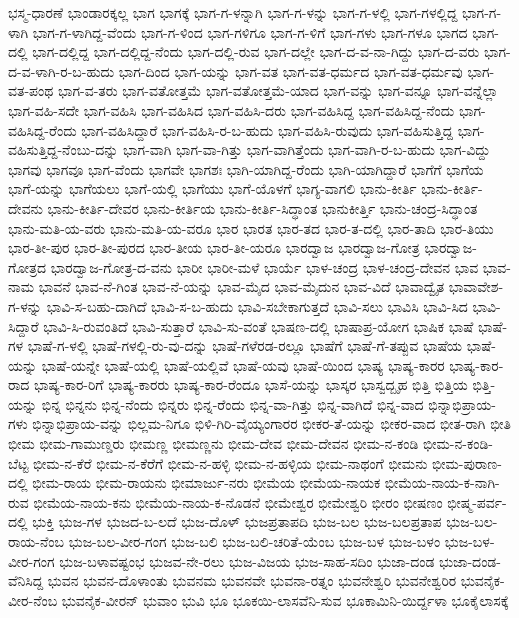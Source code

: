 ಭಸ್ಮ-ಧಾರಣೆ
ಭಾಂಡಾರಕ್ಕಲ್ಲ
ಭಾಗ
ಭಾಗಕ್ಕೆ
ಭಾಗ-ಗ-ಳನ್ನಾಗಿ
ಭಾಗ-ಗ-ಳನ್ನು
ಭಾಗ-ಗ-ಳಲ್ಲಿ
ಭಾಗ-ಗಳಲ್ಲಿದ್ದ
ಭಾಗ-ಗ-ಳಾಗಿ
ಭಾಗ-ಗ-ಳಾಗಿದ್ದ-ವೆಂದು
ಭಾಗ-ಗ-ಳಿಂದ
ಭಾಗ-ಗಳಿಗೂ
ಭಾಗ-ಗ-ಳಿಗೆ
ಭಾಗ-ಗಳು
ಭಾಗ-ಗಳೂ
ಭಾಗದ
ಭಾಗ-ದಲ್ಲಿ
ಭಾಗ-ದಲ್ಲಿದ್ದ
ಭಾಗ-ದಲ್ಲಿದ್ದ-ನೆಂದು
ಭಾಗ-ದಲ್ಲಿ-ರುವ
ಭಾಗ-ದಲ್ಲೇ
ಭಾಗ-ದ-ವ-ನಾ-ಗಿದ್ದು
ಭಾಗ-ದ-ವರು
ಭಾಗ-ದ-ವ-ಳಾಗಿ-ರ-ಬ-ಹುದು
ಭಾಗ-ದಿಂದ
ಭಾಗ-ಯನ್ನು
ಭಾಗ-ವತ
ಭಾಗ-ವತ-ಧರ್ಮದ
ಭಾಗ-ವತ-ಧರ್ಮವು
ಭಾಗ-ವತ-ಪಂಥ
ಭಾಗ-ವ-ತರು
ಭಾಗ-ವತೋತ್ತಮೆ
ಭಾಗ-ವತೋತ್ತಮೆ-ಯಾದ
ಭಾಗ-ವನ್ನು
ಭಾಗ-ವನ್ನೂ
ಭಾಗ-ವನ್ನೆಲ್ಲಾ
ಭಾಗ-ವಹಿ-ಸದೇ
ಭಾಗ-ವಹಿಸಿ
ಭಾಗ-ವಹಿಸಿದ
ಭಾಗ-ವಹಿಸಿ-ದರು
ಭಾಗ-ವಹಿಸಿದ್ದ
ಭಾಗ-ವಹಿಸಿದ್ದ-ನೆಂದು
ಭಾಗ-ವಹಿಸಿದ್ದ-ರೆಂದು
ಭಾಗ-ವಹಿಸಿದ್ದಾರೆ
ಭಾಗ-ವಹಿಸಿ-ರ-ಬ-ಹುದು
ಭಾಗ-ವಹಿಸಿ-ರುವುದು
ಭಾಗ-ವಹಿಸುತ್ತಿದ್ದ
ಭಾಗ-ವಹಿಸುತ್ತಿದ್ದ-ನೆಂಬು-ದನ್ನು
ಭಾಗ-ವಾಗಿ
ಭಾಗ-ವಾ-ಗಿತ್ತು
ಭಾಗ-ವಾಗಿತ್ತೆಂದು
ಭಾಗ-ವಾಗಿ-ರ-ಬ-ಹುದು
ಭಾಗ-ವಿದ್ದು
ಭಾಗವು
ಭಾಗವೂ
ಭಾಗ-ವೆಂದು
ಭಾಗವೇ
ಭಾಗಶಃ
ಭಾಗಿ-ಯಾಗಿದ್ದ-ರೆಂದು
ಭಾಗಿ-ಯಾಗಿದ್ದಾರೆ
ಭಾಗೆಗೆ
ಭಾಗೆಯ
ಭಾಗೆ-ಯನ್ನು
ಭಾಗೆಯಲು
ಭಾಗೆ-ಯಲ್ಲಿ
ಭಾಗೆಯು
ಭಾಗೆ-ಯೊಳಗೆ
ಭಾಗ್ಯ-ವಾಗಲಿ
ಭಾನು-ಕೀರ್ತಿ
ಭಾನು-ಕೀರ್ತಿ-ದೇವನು
ಭಾನು-ಕೀರ್ತಿ-ದೇವರ
ಭಾನು-ಕೀರ್ತಿಯ
ಭಾನು-ಕೀರ್ತಿ-ಸಿದ್ಧಾಂತ
ಭಾನುಕೀರ್ತ್ತಿ
ಭಾನು-ಚಂದ್ರ-ಸಿದ್ಧಾಂತ
ಭಾನು-ಮತಿ-ಯ-ವರು
ಭಾನು-ಮತಿ-ಯ-ವರೂ
ಭಾರ
ಭಾರತ
ಭಾರ-ತದ
ಭಾರ-ತ-ದಲ್ಲಿ
ಭಾರ-ತಾದಿ
ಭಾರ-ತಿಯು
ಭಾರ-ತೀ-ಪುರ
ಭಾರ-ತೀ-ಪುರದ
ಭಾರ-ತೀಯ
ಭಾರ-ತೀ-ಯರೂ
ಭಾರದ್ವಾಜ
ಭಾರದ್ವಾಜ-ಗೋತ್ರ
ಭಾರದ್ವಾಜ-ಗೋತ್ರದ
ಭಾರದ್ವಾಜ-ಗೋತ್ರ-ದ-ವನು
ಭಾರೀ
ಭಾರೀ-ಮಳೆ
ಭಾರ್ಯೆ
ಭಾಳ-ಚಂದ್ರ
ಭಾಳ-ಚಂದ್ರ-ದೇವನ
ಭಾವ
ಭಾವ-ನಾಮ
ಭಾವನೆ
ಭಾವ-ನೆ-ಗಿಂತ
ಭಾವ-ನೆ-ಯನ್ನು
ಭಾವ-ಮೈದ
ಭಾವ-ಮೈದುನ
ಭಾವ-ವಿದೆ
ಭಾವಾದ್ವೈತ
ಭಾವಾವೇಶ-ಗ-ಳನ್ನು
ಭಾವಿ-ಸ-ಬಹು-ದಾಗಿದೆ
ಭಾವಿ-ಸ-ಬ-ಹುದು
ಭಾವಿ-ಸಬೇಕಾಗುತ್ತದೆ
ಭಾವಿ-ಸಲು
ಭಾವಿಸಿ
ಭಾವಿ-ಸಿದ
ಭಾವಿ-ಸಿದ್ದಾರೆ
ಭಾವಿ-ಸಿ-ರುವಂತಿದೆ
ಭಾವಿ-ಸುತ್ತಾರೆ
ಭಾವಿ-ಸು-ವಂತೆ
ಭಾಷಣ-ದಲ್ಲಿ
ಭಾಷಾಪ್ರ-ಯೋಗ
ಭಾಷಿಕ
ಭಾಷೆ
ಭಾಷೆ-ಗಳ
ಭಾಷೆ-ಗ-ಳಲ್ಲಿ
ಭಾಷೆ-ಗಳಲ್ಲಿ-ರು-ವು-ದನ್ನು
ಭಾಷೆ-ಗಳೆರಡ-ರಲ್ಲೂ
ಭಾಷೆಗೆ
ಭಾಷೆ-ಗೆ-ತಪ್ಪುವ
ಭಾಷೆಯ
ಭಾಷೆ-ಯನ್ನು
ಭಾಷೆ-ಯನ್ನೇ
ಭಾಷೆ-ಯಲ್ಲಿ
ಭಾಷೆ-ಯಲ್ಲಿವೆ
ಭಾಷೆ-ಯವು
ಭಾಷೆ-ಯಿಂದ
ಭಾಷ್ಯ
ಭಾಷ್ಯ-ಕಾರರ
ಭಾಷ್ಯ-ಕಾರ-ರಾದ
ಭಾಷ್ಯ-ಕಾರ-ರಿಗೆ
ಭಾಷ್ಯ-ಕಾರರು
ಭಾಷ್ಯ-ಕಾರ-ರೆಂದೂ
ಭಾಸೆ-ಯನ್ನು
ಭಾಸ್ಕರ
ಭಾಸ್ವದ್ಬೃಹ
ಭಿತ್ತಿ
ಭಿತ್ತಿಯ
ಭಿತ್ತಿ-ಯನ್ನು
ಭಿನ್ನ
ಭಿನ್ನನು
ಭಿನ್ನ-ನೆಂದು
ಭಿನ್ನರು
ಭಿನ್ನ-ರೆಂದು
ಭಿನ್ನ-ವಾ-ಗಿತ್ತು
ಭಿನ್ನ-ವಾಗಿದೆ
ಭಿನ್ನ-ವಾದ
ಭಿನ್ನಾಭಿಪ್ರಾಯ-ಗಳು
ಭಿನ್ನಾಭಿಪ್ರಾಯ-ವನ್ನು
ಭಿಲ್ಲಮ-ನಿಗೂ
ಭಿಳಿ-ಗಿರಿ-ವೈಯ್ಯಂಗಾರರ
ಭೀಕರ-ತೆ-ಯನ್ನು
ಭೀಕರ-ವಾದ
ಭೀತ-ರಾಗಿ
ಭೀತಿ
ಭೀಮ
ಭೀಮ-ಗಾಮುಣ್ಡರು
ಭೀಮಣ್ಣ
ಭೀಮಣ್ಣನು
ಭೀಮ-ದೇವ
ಭೀಮ-ದೇವನ
ಭೀಮ-ನ-ಕಂಡಿ
ಭೀಮ-ನ-ಕಂಡಿ-ಬೆಟ್ಟ
ಭೀಮ-ನ-ಕೆರೆ
ಭೀಮ-ನ-ಕೆರೆಗೆ
ಭೀಮ-ನ-ಹಳ್ಳಿ
ಭೀಮ-ನ-ಹಳ್ಳಿಯ
ಭೀಮ-ನಾಥಂಗೆ
ಭೀಮನು
ಭೀಮ-ಪುರಾಣ-ದಲ್ಲಿ
ಭೀಮ-ರಾಯ
ಭೀಮ-ರಾಯನು
ಭೀಮಾರ್ಜು-ನರು
ಭೀಮೆಯ
ಭೀಮೆಯ-ನಾಯಕ
ಭೀಮೆಯ-ನಾಯ-ಕ-ನಾಗಿ-ರುವ
ಭೀಮೆಯ-ನಾಯ-ಕನು
ಭೀಮೆಯ-ನಾಯ-ಕ-ನೊಡನೆ
ಭೀಮೇಶ್ವರ
ಭೀಮೇಶ್ವರಿ
ಭೀರಂ
ಭೀಷಣಂ
ಭೀಷ್ಮ-ಪರ್ವ-ದಲ್ಲಿ
ಭುಕ್ತಿ
ಭುಜ-ಗಳ
ಭುಜದ-ಬ-ಲದೆ
ಭುಜ-ದೊಳ್
ಭುಜಪ್ರತಾಪದಿ
ಭುಜ-ಬಲ
ಭುಜ-ಬಲಪ್ರತಾಪ
ಭುಜ-ಬಲ-ರಾಯ-ನೆಂಬ
ಭುಜ-ಬಲ-ವೀರ-ಗಂಗ
ಭುಜ-ಬಲಿ
ಭುಜ-ಬಲಿ-ಚರಿತೆ-ಯೆಂಬ
ಭುಜ-ಬಳ
ಭುಜ-ಬಳಂ
ಭುಜ-ಬಳ-ವೀರ-ಗಂಗ
ಭುಜ-ಬಳಾವಷ್ಟಂಭ
ಭುಜವ-ನೇ-ರಲು
ಭುಜ-ವಿಜಯ
ಭುಜ-ಸಾಹ-ಸದಿಂ
ಭುಜಾ-ದಂಡ
ಭುಜಾ-ದಂಡ-ವೆನಿಸಿದ್ದ
ಭುವನ
ಭುವನ-ದೊಳಾಂತು
ಭುವನಮ
ಭುವನವೇ
ಭುವನಾ-ರತ್ನಂ
ಭುವನೇಶ್ವರಿ
ಭುವನೇಶ್ವರಿರ
ಭುವನೈಕ-ವೀರ-ನೆಂಬ
ಭುವನೈಕ-ವೀರನ್
ಭುವಾಂ
ಭುವಿ
ಭೂ
ಭೂಕಯಿ-ಲಾಸವೆನಿ-ಸುವ
ಭೂಕಾಮಿನಿ-ಯಿರ್ದ್ದಳಾ
ಭೂಕೈಲಾಸಕ್ಕೆ
